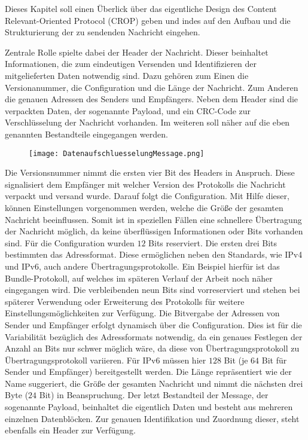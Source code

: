 Dieses Kapitel soll einen Überlick über das eigentliche Design des Content
Relevant-Oriented Protocol (CROP) geben und indes auf den Aufbau und die
Strukturierung der zu sendenden Nachricht eingehen.

Zentrale Rolle spielte dabei der Header der Nachricht. Dieser beinhaltet
Informationen, die zum eindeutigen Versenden und Identifizieren der
mitgelieferten Daten notwendig sind. Dazu gehören zum Einen die Versionanummer,
die Configuration und die Länge der Nachricht. Zum Anderen die genauen Adressen
des Senders und Empfängers. Neben dem Header sind die verpackten Daten, der
sogenannte Payload, und ein CRC-Code zur Verschlüsselung der Nachricht
vorhanden. Im weiteren soll näher auf die eben genannten Bestandteile
eingegangen werden.

\begin{figure}[H]
	\centering
	\texttt{[image: DatenaufschluesselungMessage.png]}
\end{figure}

Die Versionsnummer nimmt die ersten vier Bit des Headers in Anspruch. Diese
signalisiert dem Empfänger mit welcher Version des Protokolls die Nachricht
verpackt und versand wurde. Darauf folgt die Configuration. Mit Hilfe dieser,
können Einstellungen vorgenommen werden, welche die Größe der gesamten Nachricht
beeinflussen. Somit ist in speziellen Fällen eine schnellere Übertragung der
Nachricht möglich, da keine überflüssigen Informationen oder Bits vorhanden
sind. Für die Configuration wurden $12$ Bits reserviert. Die ersten drei Bits
bestimmten das Adressformat. Diese ermöglichen neben den Standards, wie IPv4 und
IPv6, auch andere Übertragungsprotokolle. Ein Beispiel hierfür ist das
Bundle-Protokoll, auf welches im späteren Verlauf der Arbeit noch näher
eingegangen wird.
Die verbleibenden neun Bits sind vorreserviert und stehen bei späterer
Verwendung oder Erweiterung des Protokolls für weitere Einstellungsmöglichkeiten
zur Verfügung. Die Bitvergabe der Adressen von Sender und Empfänger erfolgt
dynamisch über die Configuration. Dies ist für die Variabilität bezüglich des
Adressformats notwendig, da ein genaues Festlegen der Anzahl an Bits nur schwer
möglich wäre, da diese von Übertragungsprotokoll zu Übertragungsprotokoll
 variieren. Für IPv6 müssen hier $128$ Bit (je $64$
Bit für Sender und Empfänger) bereitgestellt werden. Die Länge repräsentiert wie
der Name suggeriert, die Größe der gesamten Nachricht und nimmt die nächsten
drei Byte ($24$ Bit) in Beanspruchung. 
Der letzt Bestandteil der Message, der sogenannte Payload, beinhaltet die
eigentlich Daten und besteht aus mehreren einzelnen Datenblöcken. Zur genauen
Identifikation und Zuordnung dieser, steht ebenfalls ein Header zur Verfügung.


